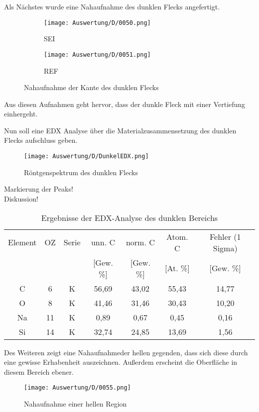 \newpage
Als Nächstes wurde eine Nahaufnahme des dunklen Flecks angefertigt.
\begin{figure}[h]
    \centering
    
    \begin{subfigure}[b]{0.45\textwidth}
        \centering
        \texttt{[image: Auswertung/D/0050.png]}
        \caption{SEI}
    \end{subfigure}
    \hfill
    \begin{subfigure}[b]{0.45\textwidth}
        \centering
        \texttt{[image: Auswertung/D/0051.png]}
        \caption{REF}
    \end{subfigure}
    \caption{Nahaufnahme der Kante des dunklen Flecks}
\end{figure}

Aus diesen Aufnahmen geht hervor, dass der dunkle Fleck mit einer Vertiefung einhergeht.

\newpage
Nun soll eine EDX Analyse über die Materialzusammensetzung des dunklen Flecks aufschluss geben.
\begin{figure}[h]
    \centering
    \texttt{[image: Auswertung/D/DunkelEDX.png]}
    \caption{Röntgenspektrum des dunklen Flecks}
\end{figure}

Markierung der Peaks!\\
Diskussion!\\

\begin{table}[h]
    \centering
    \begin{tabular}{c|c|c|c|c|c|c}
        Element & OZ &Serie& unn. C & norm. C &  Atom. C  & Fehler (1 Sigma) \\
         & & & [Gew. \%] & [Gew. \%] & [At. \%] & [Gew. \%] \\
        \hline\hline
        C & 6 & K & 56,69 & 43,02 & 55,43 & 14,77\\
        O & 8 & K & 41,46 & 31,46 & 30,43 & 10,20\\
        Na & 11 & K & 0,89 & 0,67 & 0,45 & 0,16\\
        Si & 14 & K & 32,74 & 24,85 & 13,69 & 1,56
    \end{tabular}
    \caption{Ergebnisse der EDX-Analyse des dunklen Bereichs}
\end{table}

\newpage
Des Weiteren zeigt eine Nahaufnahmeder hellen gegenden, dass sich diese durch eine gewisse Erhabenheit auszeichnen. Außerdem erscheint die Oberfläche in diesem Bereich ebener.
\begin{figure}[h]
    \centering
    \texttt{[image: Auswertung/D/0055.png]}
    \caption{Nahaufnahme einer hellen Region}
\end{figure}

